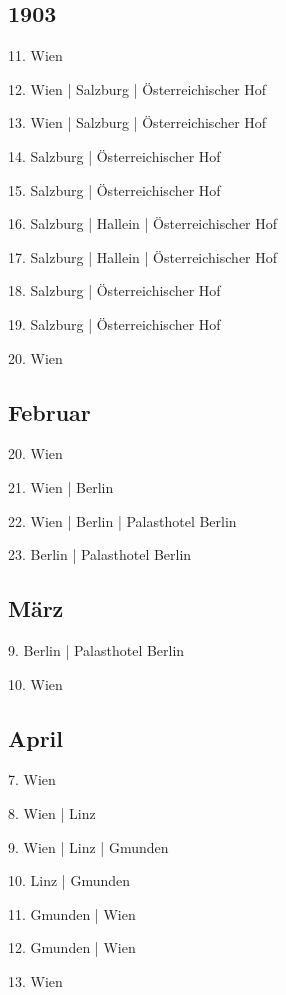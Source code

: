 \documentclass[twoside=false,titlepage=false,open=any, parskip=never, fontsize=10pt, headings=small, chapterprefix=false, appendixprefix=false, DIV=15]{scrbook}
\begin{document}
\begin{multicols}{3}
            \chapter*{1903}
            11. Wien\par
            12. Wien | Salzburg | Österreichischer Hof\par
            13. Wien | Salzburg | Österreichischer Hof\par
            14. Salzburg | Österreichischer Hof\par
            15. Salzburg | Österreichischer Hof\par
            16. Salzburg | Hallein | Österreichischer Hof\par
            17. Salzburg | Hallein | Österreichischer Hof\par
            18. Salzburg | Österreichischer Hof\par
            19. Salzburg | Österreichischer Hof\par
            20. Wien\par
            \section*{Februar}
            20. Wien\par
            21. Wien | Berlin\par
            22. Wien | Berlin | Palasthotel Berlin\par
            23. Berlin | Palasthotel Berlin\par
            \section*{März}
            9. Berlin | Palasthotel Berlin\par
            10. Wien\par
            \section*{April}
            7. Wien\par
            8. Wien | Linz\par
            9. Wien | Linz | Gmunden\par
            10. Linz | Gmunden\par
            11. Gmunden | Wien\par
            12. Gmunden | Wien\par
            13. Wien\par

\end{multicols}
\end{document}
